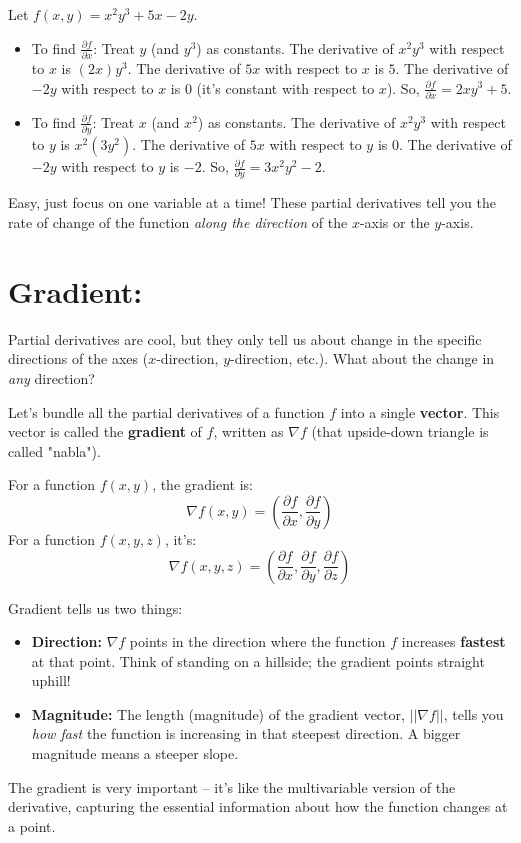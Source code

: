 \documentclass[11pt]{article}
\begin{document}
\begin{example}
    Let $f(x, y) = x^2y^3 + 5x - 2y$.
\begin{itemize}
    \item To find $\frac{\partial f}{\partial x}$: Treat $y$ (and $y^3$) as constants.
    The derivative of $x^2y^3$ with respect to $x$ is $(2x)y^3$.
    The derivative of $5x$ with respect to $x$ is $5$.
    The derivative of $-2y$ with respect to $x$ is $0$ (it's constant with respect to $x$).
    So, $\frac{\partial f}{\partial x} = 2xy^3 + 5$.
    \item To find $\frac{\partial f}{\partial y}$: Treat $x$ (and $x^2$) as constants.
    The derivative of $x^2y^3$ with respect to $y$ is $x^2(3y^2)$.
    The derivative of $5x$ with respect to $y$ is $0$.
    The derivative of $-2y$ with respect to $y$ is $-2$.
    So, $\frac{\partial f}{\partial y} = 3x^2y^2 - 2$.
\end{itemize}
\end{example}
Easy, just focus on one variable at a time! These partial derivatives tell you the rate of change of the function \emph{along the direction} of the $x$-axis or the $y$-axis.

\section{Gradient:}

Partial derivatives are cool, but they only tell us about change in the specific directions of the axes ($x$-direction, $y$-direction, etc.). What about the change in \emph{any} direction?

Let's bundle all the partial derivatives of a function $f$ into a single \textbf{vector}. This vector is called the \textbf{gradient} of $f$, written as $\nabla f$ (that upside-down triangle is called "nabla").

For a function $f(x, y)$, the gradient is:
$$ \nabla f(x, y) = \left( \frac{\partial f}{\partial x}, \frac{\partial f}{\partial y} \right) $$
For a function $f(x, y, z)$, it's:
$$ \nabla f(x, y, z) = \left( \frac{\partial f}{\partial x}, \frac{\partial f}{\partial y}, \frac{\partial f}{\partial z} \right) $$

Gradient tells us two things:
\begin{itemize}
    \item \textbf{Direction:} $\nabla f$ points in the direction where the function $f$ increases \textbf{fastest} at that point. Think of standing on a hillside; the gradient points straight uphill!
    \item \textbf{Magnitude:} The length (magnitude) of the gradient vector, $||\nabla f||$, tells you \emph{how fast} the function is increasing in that steepest direction. A bigger magnitude means a steeper slope.
\end{itemize}
The gradient is very important – it's like the multivariable version of the derivative, capturing the essential information about how the function changes at a point.
\end{document}
